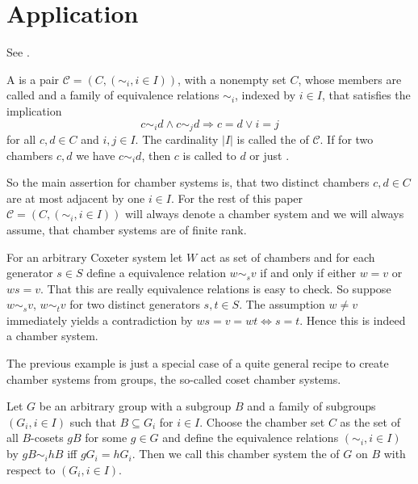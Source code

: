 \section{Application}
\label{sec:application}

See \cite{horn:kac-moody}.

\begin{defi}
	A  is a pair $\mathcal{C} = (C,(\sim_i, i \in I))$, with a nonempty set $C$, whose members are called  and a family of equivalence relations $\sim_i$, indexed by $i \in I$, that satisfies the implication
	$$ c \sim_i d \wedge c \sim_j d \Rightarrow c = d \vee i = j $$
	for all $c,d \in C$ and $i,j \in I$. The cardinality $|I|$ is called the  of $\mathcal{C}$. If for two chambers $c,d$ we have $c \sim_i d$, then $c$ is called  to $d$ or just .
\end{defi}

So the main assertion for chamber systems is, that two distinct chambers $c,d \in C$ are at most adjacent by one $i \in I$. For the rest of this paper $\mathcal{C} = (C,(\sim_i, i \in I))$ will always denote a chamber system and we will always assume, that chamber systems are of finite rank.

\begin{exam}
	For an arbitrary Coxeter system let $W$ act as set of chambers and for each generator $s \in S$ define a equivalence relation $w \sim_s v$ if and only if either $w = v$ or $ws = v$. That this are really equivalence relations is easy to check. So suppose $w \sim_s v$, $w \sim_t v$ for two distinct generators $s,t \in S$. The assumption $w \neq v$ immediately yields a contradiction by $ws = v = wt \iff s = t$. Hence this is indeed a chamber system.
\end{exam}

The previous example is just a special case of a quite general recipe to create chamber systems from groups, the so-called coset chamber systems.

\begin{defi}
	Let $G$ be an arbitrary group with a subgroup $B$ and a family of subgroups $(G_i, i \in I)$ such that $B \subseteq G_i$ for $i \in I$. Choose the chamber set $C$ as the set of all $B$-cosets $gB$ for some $g \in G$ and define the equivalence relations $(\sim_i, i \in I)$ by $gB \sim_i hB$ iff $gG_i = hG_i$. Then we call this chamber system the  of $G$ on $B$ with respect to $(G_i, i \in I)$.
\end{defi}

